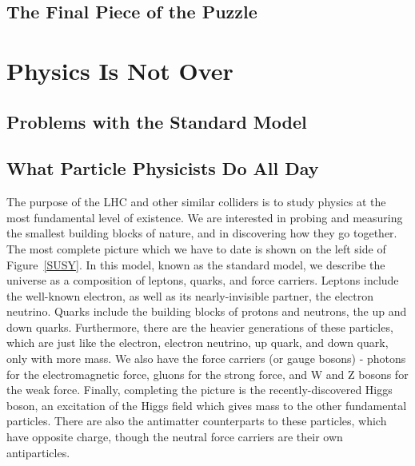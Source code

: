 \subsection{The Final Piece of the Puzzle}

\section{Physics Is Not Over}

\subsection{Problems with the Standard Model}

\subsection{What Particle Physicists Do All Day}


The purpose of the LHC and other similar colliders is to study physics at the most fundamental level of existence. We are interested in probing and measuring the smallest building blocks of nature, and in discovering how they go together. The most complete picture which we have to date is shown on the left side of Figure~\ref{SUSY}. In this model, known as the standard model, we describe the universe as a composition of leptons, quarks, and force carriers. Leptons include the well-known electron, as well as its nearly-invisible partner, the electron neutrino. Quarks include the building blocks of protons and neutrons, the up and down quarks. Furthermore, there are the heavier generations of these particles, which are just like the electron, electron neutrino, up quark, and down quark, only with more mass. We also have the force carriers (or gauge bosons) - photons for the electromagnetic force, gluons for the strong force, and W and Z bosons for the weak force. Finally, completing the picture is the recently-discovered Higgs boson, an excitation of the Higgs field which gives mass to the other fundamental particles. There are also the antimatter counterparts to these particles, which have opposite charge, though the neutral force carriers are their own antiparticles.


